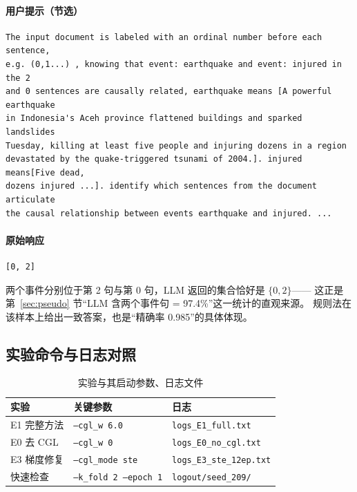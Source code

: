 \paragraph{用户提示（节选）}
\begin{lstlisting}
The input document is labeled with an ordinal number before each sentence,
e.g. (0,1...) , knowing that event: earthquake and event: injured in the 2
and 0 sentences are causally related, earthquake means [A powerful earthquake
in Indonesia's Aceh province flattened buildings and sparked landslides
Tuesday, killing at least five people and injuring dozens in a region
devastated by the quake-triggered tsunami of 2004.]. injured means[Five dead,
dozens injured ...]. identify which sentences from the document articulate
the causal relationship between events earthquake and injured. ...
\end{lstlisting}

\paragraph{原始响应}
\begin{lstlisting}
[0, 2]
\end{lstlisting}

两个事件分别位于第 2 句与第 0 句，LLM 返回的集合恰好是 $\{0,2\}$——
这正是第~\ref{sec:pseudo} 节“LLM 含两个事件句 = 97.4\%”这一统计的直观来源。
规则法在该样本上给出一致答案，也是“精确率 0.985”的具体体现。

\subsection{实验命令与日志对照}

\begin{table}[H]
\centering
\caption{实验与其启动参数、日志文件}
\label{tab:runs}
\small
\begin{tabular}{lll}
\toprule
实验 & 关键参数 & 日志\\
\midrule
E1 完整方法 & \texttt{--cgl\_w 6.0} & \texttt{logs\_E1\_full.txt}\\
E0 去 CGL & \texttt{--cgl\_w 0} & \texttt{logs\_E0\_no\_cgl.txt}\\
E3 梯度修复 & \texttt{--cgl\_mode ste} & \texttt{logs\_E3\_ste\_12ep.txt}\\
快速检查 & \texttt{--k\_fold 2 --epoch 1} & \texttt{logout/seed\_209/}\\
\bottomrule
\end{tabular}
\end{table}

